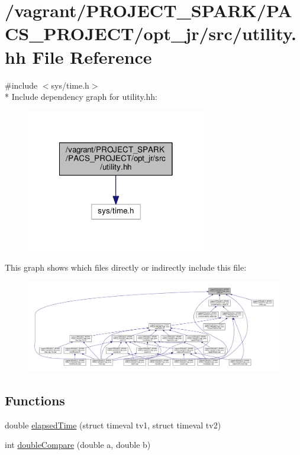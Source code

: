 \hypertarget{utility_8hh}{\section{/vagrant/\-P\-R\-O\-J\-E\-C\-T\-\_\-\-S\-P\-A\-R\-K/\-P\-A\-C\-S\-\_\-\-P\-R\-O\-J\-E\-C\-T/opt\-\_\-jr/src/utility.hh File Reference}
\label{utility_8hh}
}
{\ttfamily \#include $<$sys/time.\-h$>$}\\*
Include dependency graph for utility.\-hh\-:\nopagebreak
\begin{figure}[H]
\begin{center}
\leavevmode
\includegraphics[width=222pt]{utility_8hh__incl}
\end{center}
\end{figure}
This graph shows which files directly or indirectly include this file\-:\nopagebreak
\begin{figure}[H]
\begin{center}
\leavevmode
\includegraphics[width=350pt]{utility_8hh__dep__incl}
\end{center}
\end{figure}
\subsection*{Functions}
\begin{DoxyCompactItemize}
\item 
double \hyperlink{utility_8hh_affb98702b6d646743be567444260ac1f}{elapsed\-Time} (struct timeval tv1, struct timeval tv2)
\item 
int \hyperlink{utility_8hh_a9d47b6f031f040e12b256b8aaca54671}{double\-Compare} (double a, double b)
\end{DoxyCompactItemize}
